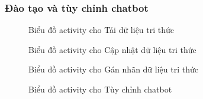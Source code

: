 \subsubsection{Đào tạo và tùy chỉnh chatbot}
\begin{figure}[H]
    \centering
     
    \vspace{0.5cm}
    \caption{Biểu đồ activity cho Tải dữ liệu tri thức}
    \label{fig:enter-label}
\end{figure}
\begin{figure}[H]
    \centering
     
    \vspace{0.5cm}
    \caption{Biểu đồ activity cho Cập nhật dữ liệu tri thức}
    \label{fig:enter-label}
\end{figure}
\begin{figure}[H]
    \centering
     
    \vspace{0.5cm}
    \caption{Biểu đồ activity cho Gán nhãn dữ liệu tri thức}
    \label{fig:enter-label}
\end{figure}
\begin{figure}[H]
    \centering
     
    \vspace{0.5cm}
    \caption{Biểu đồ activity cho Tùy chỉnh chatbot}
    \label{fig:enter-label}
\end{figure}
